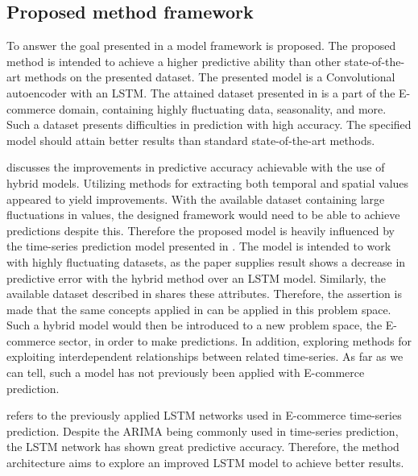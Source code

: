 \subsection{Proposed method framework}


To answer the goal presented in  a model framework is proposed.
The proposed method is intended to achieve a higher predictive ability than other state-of-the-art methods on the presented dataset.
The presented model is a Convolutional autoencoder with an LSTM.
The attained dataset presented in 
is a part of the E-commerce domain, containing highly fluctuating data, seasonality, and more.
Such a dataset presents difficulties in prediction with high accuracy. The specified model should attain better results than standard state-of-the-art methods.

 discusses the improvements in predictive accuracy achievable with the use of hybrid models.
Utilizing methods for extracting both temporal and spatial values appeared to yield improvements.
With the available dataset containing large fluctuations in values, the designed framework would need to be able to achieve predictions despite this.
Therefore the proposed model is heavily influenced by the time-series prediction model presented in \cite{Zhao2019}.
The model is intended to work with highly fluctuating datasets, as the paper supplies result shows a decrease in predictive error with the hybrid method over an LSTM model.
Similarly, the available dataset described in
 shares these attributes.
Therefore, the assertion is made that the same concepts applied in \cite{Zhao2019} can be applied in this problem space.
Such a hybrid model would then be introduced to a new problem space, the E-commerce sector, in order to make predictions.
In addition, exploring methods for exploiting interdependent relationships between related time-series.
As far as we can tell, such a model has not previously been applied with E-commerce prediction.

refers to the previously applied LSTM networks used in E-commerce time-series prediction.
Despite the ARIMA being commonly used in time-series prediction, the LSTM network has shown great predictive accuracy.
Therefore, the method architecture aims to explore an improved LSTM model to achieve better results.

